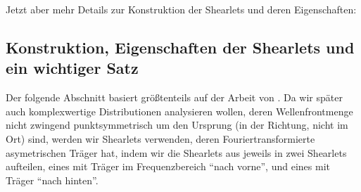 Jetzt aber mehr Details zur Konstruktion der Shearlets und deren Eigenschaften:


\subsection{Konstruktion, Eigenschaften der Shearlets und ein wichtiger Satz} %
\label{sec:konstruktion_und_eigenschaften_der_shearlets}

Der folgende Abschnitt basiert größtenteils auf der Arbeit von \textcite{Kutyniok2008}.
 Da wir später auch komplexwertige Distributionen analysieren wollen, deren Wellenfrontmenge nicht zwingend punktsymmetrisch um den Ursprung (in der Richtung, nicht im Ort) sind, werden wir Shearlets verwenden, deren Fouriertransformierte asymetrischen Träger hat, indem wir die Shearlets aus \cite{Kutyniok2008} jeweils in zwei Shearlets aufteilen, eines mit Träger im Frequenzbereich "`nach vorne"', und eines mit Träger "`nach hinten"'. 


